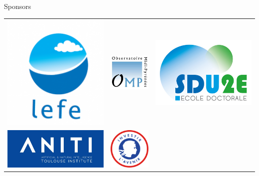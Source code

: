 \documentclass[pressentation,10pt,aspectratio=1610, xcolor=table]{beamer}
\begin{document}
\begin{frame}[label={sec:org03991ea}]{Sponsors}
\begin{center}
  \begin{tabular}{ccc}
    \includegraphics[width=0.2\linewidth]{pictures/lefe_manu.png} & \includegraphics[width=0.2\linewidth]{pictures/logoomp_large.jpg} &                                                                                                                          \includegraphics[width=0.2\linewidth]{pictures/logosdu2e300dpi.jpg}\\
        \includegraphics[width=0.2\linewidth]{pictures/logo_aniti.jpg} &     \includegraphics[width=0.2\linewidth]{pictures/logo_avenir.png}    
  \end{tabular}
\end{center}
\end{frame}
\end{document}
